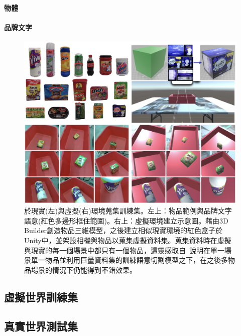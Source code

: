 \paragraph{物體}
\paragraph{品牌文字}

\begin{figure}[ht]
	\centering
	\includegraphics[height=!, width=1.0\linewidth, keepaspectratio=true]
	{./figures/bn-benchmark-dataset.png}
  \caption{於現實(左)與虛擬(右)環境蒐集訓練集。左上：物品範例與品牌文字語意(紅色多邊形框住範圍)。右上：虛擬環境建立示意圖。藉由3D Builder創造物品三維模型，之後建立相似現實環境的紅色盒子於Unity中，並架設相機與物品以蒐集虛擬資料集。蒐集資料時在虛擬與現實的每一個場景中都只有一個物品，這靈感取自~\cite{}說明在單一場景單一物品並利用巨量資料集的訓練語意切割模型之下，在之後多物品場景的情況下仍能得到不錯效果。}
  \label{figure:testset}
\end{figure}


\subsection{虛擬世界訓練集}

\subsection{真實世界測試集}


